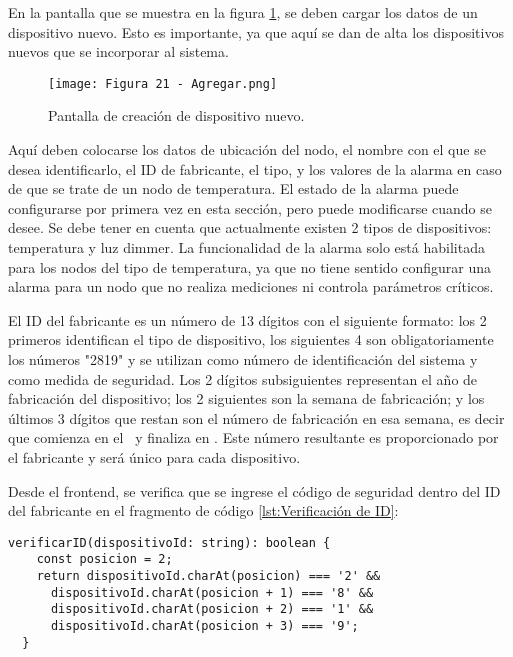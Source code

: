 En la pantalla que se muestra en la figura \ref{fig:21}, se deben cargar los datos de un dispositivo nuevo. Esto es importante, ya que aquí se dan de alta los dispositivos nuevos que se incorporar al sistema.

\begin{figure}[h]
\centering
\texttt{[image: Figura 21 - Agregar.png]}
\caption[Pantalla home]{Pantalla de creación de dispositivo nuevo. \footnotemark}
\label{fig:21}
\end{figure}

Aquí deben colocarse los datos de ubicación del nodo, el nombre con el que se desea identificarlo, el ID de fabricante, el tipo, y los valores de la alarma en caso de que se trate de un nodo de temperatura. El estado de la alarma puede configurarse por primera vez en esta sección, pero puede modificarse cuando se desee. Se debe tener en cuenta que actualmente existen 2 tipos de dispositivos: temperatura y luz dimmer. La funcionalidad de la alarma solo está habilitada para los nodos del tipo de temperatura, ya que no tiene sentido configurar una alarma para un nodo que no realiza mediciones ni controla parámetros críticos.

El ID del fabricante es un número de 13 dígitos con el siguiente formato: los 2 primeros identifican el tipo de dispositivo, los siguientes 4 son obligatoriamente los números "2819" y se utilizan como número de identificación del sistema y como medida de seguridad. Los 2 dígitos subsiguientes representan el año de fabricación del dispositivo; los 2 siguientes son la semana de fabricación; y los últimos 3 dígitos que restan son el número de fabricación en esa semana, es decir que comienza en el \textquotedbl\ y finaliza en \textquotedbl. Este número resultante es proporcionado por el fabricante y será único para cada dispositivo.

Desde el frontend, se verifica que se ingrese el código de seguridad dentro del ID del fabricante en el fragmento de código \ref{lst:Verificación de ID}:

\begin{lstlisting}[caption={Verificación de ID.}, label={lst:Verificación de ID}]
verificarID(dispositivoId: string): boolean {
    const posicion = 2;
    return dispositivoId.charAt(posicion) === '2' &&
      dispositivoId.charAt(posicion + 1) === '8' &&
      dispositivoId.charAt(posicion + 2) === '1' &&
      dispositivoId.charAt(posicion + 3) === '9';
  }
\end{lstlisting}

